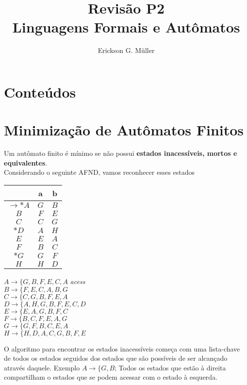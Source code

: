 \documentclass[]{article}
\title{Revisão P2\\Linguagens Formais e Autômatos}
\author{Erickson G. Müller}
\date{}
\begin{document}
\maketitle
\section*{Conteúdos}

\section{Minimização de Autômatos Finitos}
Um autômato finito é mínimo se não possui \textbf{estados inacessíveis, mortos e equivalentes}.\\
Considerando o seguinte AFND, vamos reconhecer esses estados\\
\begin{minipage}[t]{0.43\textwidth}
\centering
\begin{tabular}{|c|c|c|} %
            \toprule %
            & a & b \\
            \midrule %
		$\to *A $ & $G$ & $B$\\
		$B$ & $F$ & $E$\\
		$C$ & $C$ & $G$\\
		$*D$ & $A$ & $H$\\
		$E$ & $E$ & $A$\\
		$F$ & $B$ & $C$\\
		$*G$ & $G$ & $F$\\
		$H$ & $H$ & $D$\\
            \bottomrule %
        \end{tabular}
\end{minipage} 
\hfill
\begin{minipage}{0.43\textwidth}   
$A\to \{ G,B,F,E,C,A$ \textit{acess}\\
$B\to \{F,E,C,A,B,G$\\
$C\to \{C,G,B,F,E,A$\\
$D \to \{A,H,G,B,F,E,C,D$\\
$E \to \{ E,A,G,B,F,C$\\
$F\to \{ B,C,F,E,A,G$\\
$G\to \{ G,F,B,C,E,A$\\
$H \to \{ H,D,A,C,G,B,F,E$\\
\end{minipage}
    
O algoritmo para encontrar os estados inacessíveis começa com uma lista-chave de todos os estados seguidos dos estados que são possíveis de ser alcançado através daquele. Exemplo $A \to \{ G, B$; Todos os estados que estão à direita compartilham o estados que se podem acessar com o estado à esquerda.
\end{document}
